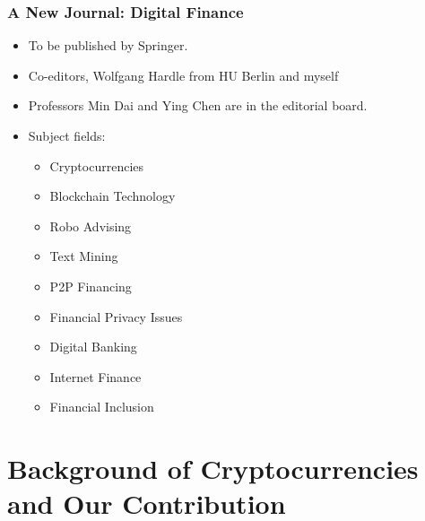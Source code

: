 \documentclass[notes=show, beamer, handout]{beamer}
\begin{document}
\begin{frame}
    \frametitle{A New Journal: Digital Finance}

    \begin{itemize}
        \item To be published by Springer.
    \item  Co-editors, Wolfgang Hardle from HU Berlin and myself
    \item Professors Min Dai and Ying Chen are in the editorial board.
   \item Subject fields:

    \begin{itemize}
       \item Cryptocurrencies
       \item Blockchain Technology
       \item Robo Advising
       \item Text Mining
       \item P2P Financing
       \item Financial Privacy Issues
        \item Digital Banking
       \item  Internet Finance
       \item Financial Inclusion
    \end{itemize}
       \end{itemize}
\end{frame}






\section{Background of Cryptocurrencies and Our Contribution}
\end{document}
